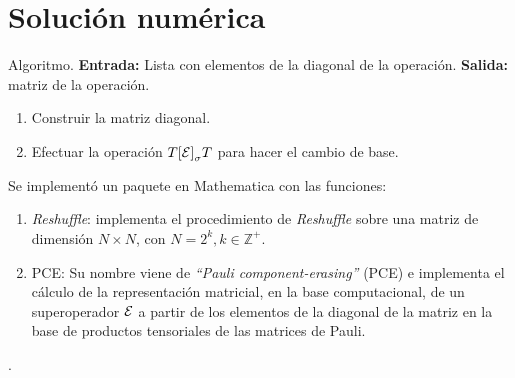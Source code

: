 \section{Solución numérica} %





Algoritmo. \textbf{Entrada:} Lista con elementos de la diagonal de
la operación. \textbf{Salida:} matriz de la operación.
\begin{enumerate}
\item Construir la matriz diagonal.
\item Efectuar la operación $T\qty[\mathcal{E}]_{\sigma}T$ para hacer
el cambio de base.
\end{enumerate}

Se implementó un paquete en Mathematica con las funciones:
\begin{enumerate}
\item \textit{Reshuffle}: implementa el procedimiento de 
\textit{Reshuffle} sobre una matriz de dimensión $N\times N$,
con $N=2^k, k\in \mathbb{Z}^+$.

\item PCE: Su nombre viene de \textit{``Pauli component-erasing''}
(PCE) e implementa el cálculo de la representación matricial, en la 
base computacional, de
un superoperador $\mathcal{E}$ a partir de los elementos de la diagonal
de la matriz en la base de productos tensoriales de las matrices 
de Pauli.
\end{enumerate}.




